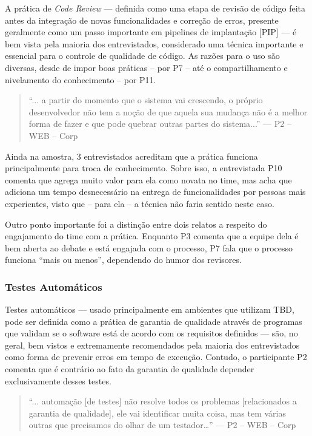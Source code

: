 A prática de \emph{Code Review} \cite{codeReview} --- definida como uma etapa de revisão de código feita antes da integração de novas funcionalidades e correção de erros, presente geralmente como um passo importante em pipelines de implantação [PIP] --- é bem vista pela maioria dos entrevistados, considerado uma técnica importante e essencial para o controle de qualidade de código. As razões para o uso são diversas, desde de impor boas práticas -- por P7 -- até o compartilhamento e nivelamento do conhecimento -- por P11.

\begin{quote}
    ``... a partir do momento que o sistema vai crescendo, o próprio desenvolvedor não tem a noção de que aquela sua mudança não é a melhor forma de fazer e que pode quebrar outras partes do sistema...'' --- P2 -- WEB -- Corp
\end{quote}

Ainda na amostra, 3 entrevistados acreditam que a prática funciona principalmente para troca de conhecimento. Sobre isso, a entrevistada P10 comenta que agrega muito valor para ela como novata no time, mas acha que adiciona um tempo desnecessário na entrega de funcionalidades por pessoas mais experientes, visto que -- para ela -- a técnica não faria sentido neste caso.

Outro ponto importante foi a distinção entre dois relatos a respeito do engajamento do time com a prática. Enquanto P3 comenta que a equipe dela é bem aberta ao debate e está engajada com o processo, P7 fala que o processo funciona ``mais ou menos'', dependendo do humor dos revisores.

\subsubsection*{Testes Automáticos}

Testes automáticos ---  usado principalmente em ambientes que utilizam TBD, pode ser definida como a prática de garantia de qualidade através de programas que validam se o software está de acordo com os requisitos definidos --- são, no geral, bem vistos e extremamente recomendados pela maioria dos entrevistados como forma de prevenir erros em tempo de execução. Contudo, o participante P2 comenta que é contrário ao fato da garantia de qualidade depender exclusivamente desses testes.

\begin{quote}
    ``... automação [de testes] não resolve todos os problemas [relacionados a garantia de qualidade], ele vai identificar muita coisa, mas tem várias outras que precisamos do olhar de um testador…'' --- P2 -- WEB -- Corp
\end{quote}

